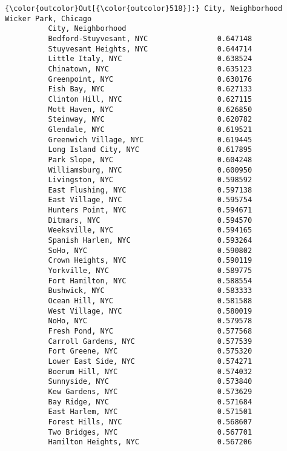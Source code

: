 \documentclass[11pt]{article}
\begin{document}
\begin{Verbatim}[commandchars=\\\{\}]
{\color{outcolor}Out[{\color{outcolor}518}]:} City, Neighborhood         Wicker Park, Chicago
          City, Neighborhood                             
          Bedford-Stuyvesant, NYC                0.647148
          Stuyvesant Heights, NYC                0.644714
          Little Italy, NYC                      0.638524
          Chinatown, NYC                         0.635123
          Greenpoint, NYC                        0.630176
          Fish Bay, NYC                          0.627133
          Clinton Hill, NYC                      0.627115
          Mott Haven, NYC                        0.626850
          Steinway, NYC                          0.620782
          Glendale, NYC                          0.619521
          Greenwich Village, NYC                 0.619445
          Long Island City, NYC                  0.617895
          Park Slope, NYC                        0.604248
          Williamsburg, NYC                      0.600950
          Livingston, NYC                        0.598592
          East Flushing, NYC                     0.597138
          East Village, NYC                      0.595754
          Hunters Point, NYC                     0.594671
          Ditmars, NYC                           0.594570
          Weeksville, NYC                        0.594165
          Spanish Harlem, NYC                    0.593264
          SoHo, NYC                              0.590802
          Crown Heights, NYC                     0.590119
          Yorkville, NYC                         0.589775
          Fort Hamilton, NYC                     0.588554
          Bushwick, NYC                          0.583333
          Ocean Hill, NYC                        0.581588
          West Village, NYC                      0.580019
          NoHo, NYC                              0.579578
          Fresh Pond, NYC                        0.577568
          Carroll Gardens, NYC                   0.577539
          Fort Greene, NYC                       0.575320
          Lower East Side, NYC                   0.574271
          Boerum Hill, NYC                       0.574032
          Sunnyside, NYC                         0.573840
          Kew Gardens, NYC                       0.573629
          Bay Ridge, NYC                         0.571684
          East Harlem, NYC                       0.571501
          Forest Hills, NYC                      0.568607
          Two Bridges, NYC                       0.567701
          Hamilton Heights, NYC                  0.567206

\end{Verbatim}
\end{document}
